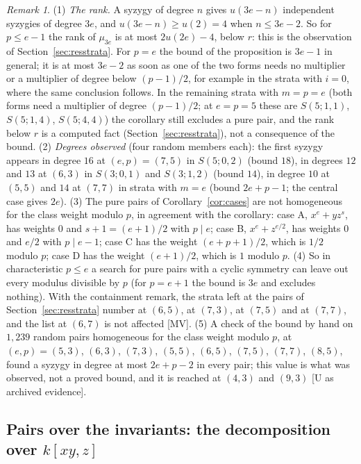 \documentclass[11pt]{article}
\theoremstyle{definition}
\theoremstyle{remark}
\newtheorem{remark}{Remark}
\begin{document}
\begin{remark}\label{rem:pdivm}
(1) \emph{The rank.} A syzygy of degree $n$ gives $u(3e-n)$ independent syzygies of degree $3e$, and $u(3e-n)\ge u(2)=4$ when $n\le3e-2$. So for $p\le e-1$ the rank of $\mu_{3e}$ is at most $2u(2e)-4$, below $r$: this is the observation of Section~\ref{sec:resstrata}. For $p=e$ the bound of the proposition is $3e-1$ in general; it is at most $3e-2$ as soon as one of the two forms needs no multiplier or a multiplier of degree below $(p-1)/2$, for example in the strata with $i=0$, where the same conclusion follows. In the remaining strata with $m=p=e$ (both forms need a multiplier of degree $(p-1)/2$; at $e=p=5$ these are $S(5;1,1)$, $S(5;1,4)$, $S(5;4,4)$) the corollary still excludes a pure pair, and the rank below $r$ is a computed fact (Section~\ref{sec:resstrata}), not a consequence of the bound. (2) \emph{Degrees observed} (four random members each): the first syzygy appears in degree $16$ at $(e,p)=(7,5)$ in $S(5;0,2)$ (bound $18$), in degrees $12$ and $13$ at $(6,3)$ in $S(3;0,1)$ and $S(3;1,2)$ (bound $14$), in degree $10$ at $(5,5)$ and $14$ at $(7,7)$ in strata with $m=e$ (bound $2e+p-1$; the central case gives $2e$). (3) The pure pairs of Corollary~\ref{cor:cases} are not homogeneous for the class weight modulo $p$, in agreement with the corollary: case A, $x^e+yz^s$, has weights $0$ and $s+1=(e+1)/2$ with $p\mid e$; case B, $x^e+z^{e/2}$, has weights $0$ and $e/2$ with $p\mid e-1$; case C has the weight $(e+p+1)/2$, which is $1/2$ modulo $p$; case D has the weight $(e+1)/2$, which is $1$ modulo $p$. (4) So in characteristic $p\le e$ a search for pure pairs with a cyclic symmetry can leave out every modulus divisible by $p$ (for $p=e+1$ the bound is $3e$ and excludes nothing). With the containment remark, the strata left at the pairs of Section~\ref{sec:resstrata} number \nwcLeftSixFive{} at $(6,5)$, \nwcLeftSevenThree{} at $(7,3)$, \nwcLeftSevenFive{} at $(7,5)$ and \nwcLeftSevenSeven{} at $(7,7)$, and the list at $(6,7)$ is not affected [MV]. (5) A check of the bound by hand on $1{,}239$ random pairs homogeneous for the class weight modulo $p$, at $(e,p)=(5,3)$, $(6,3)$, $(7,3)$, $(5,5)$, $(6,5)$, $(7,5)$, $(7,7)$, $(8,5)$, found a syzygy in degree at most $2e+p-2$ in every pair; this value is what was observed, not a proved bound, and it is reached at $(4,3)$ and $(9,3)$ [U as archived evidence].
\end{remark}

\subsection{Pairs over the invariants: the decomposition over \texorpdfstring{$k[xy,z]$}{k[xy,z]}}
\label{sec:invariants}
\end{document}
